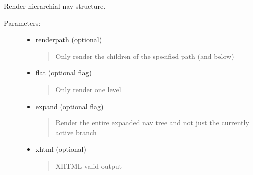 \documentclass[letterpaper,10pt,english]{sphinxmanual}
\begin{document}
\begin{fulllineitems}
\begin{fulllineitems}
\begin{description}
\begin{itemize}
\end{itemize}

\end{description}

\end{fulllineitems}


\begin{fulllineitems}
\label{knop_nav:knop_nav.renderhtml}
\end{fulllineitems}


\begin{fulllineitems}
Render hierarchial nav structure.
\begin{description}
\item[{Parameters:}] \leavevmode\begin{itemize}
\item {} 
renderpath (optional)
\begin{quote}

Only render the children of the specified path (and below)
\end{quote}

\item {} 
flat (optional flag)
\begin{quote}

Only render one level
\end{quote}

\item {} 
expand (optional flag)
\begin{quote}

Render the entire expanded nav tree and not just the currently active branch
\end{quote}

\item {} 
xhtml (optional)
\begin{quote}

XHTML valid output
\end{quote}


\end{itemize}
\end{description}
\end{fulllineitems}
\end{fulllineitems}
\end{document}
